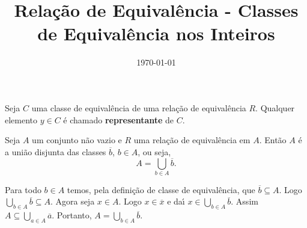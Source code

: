 \documentclass{beamer}
\title{Rela\c{c}\~ao de Equival\^encia - Classes de Equivalência nos Inteiros}
\author[\autor]{\autor}
\institute[\instituto]{\instituto}
\date{\today}
\begin{document}
    \begin{frame}
        \maketitle
    \end{frame}


    \begin{frame}
        \begin{definicao}
            Seja $C$ uma classe de equival{\^e}ncia de uma rela{\c c}{\~a}o de equival{\^e}ncia $R$. Qualquer elemento $y\in C$ {\'e} chamado \textbf{representante} de $C$.
        \end{definicao}

        \begin{proposicao}
            Seja $A$ um conjunto n{\~a}o vazio e $R$ uma rela{\c c}{\~a}o de equival{\^e}ncia em $A$. Ent{\~a}o $A$ {\'e} a uni{\~a}o disjunta das classes $\overline{b}$, $b \in A$, ou seja,
            \[
                A = \bigcup_{b\in A}\overline{b}.
            \]
        \end{proposicao}
        \begin{prova}
            Para todo $b\in A$ temos, pela defini\c{c}\~ao de classe de equival\^encia, que $\overline{b}\subseteq A$. Logo $\bigcup_{b\in A}\overline{b}\subseteq A$. Agora seja $x\in A$. Logo $x \in \overline{x}$ e da{\'\i} $x\in \bigcup_{b\in A}\overline{b}$. Assim $A\subseteq\bigcup_{a\in A}\overline{a}$. Portanto, $A=\bigcup_{b\in A}\overline{b}$.
        \end{prova}
    \end{frame}
\end{document}
